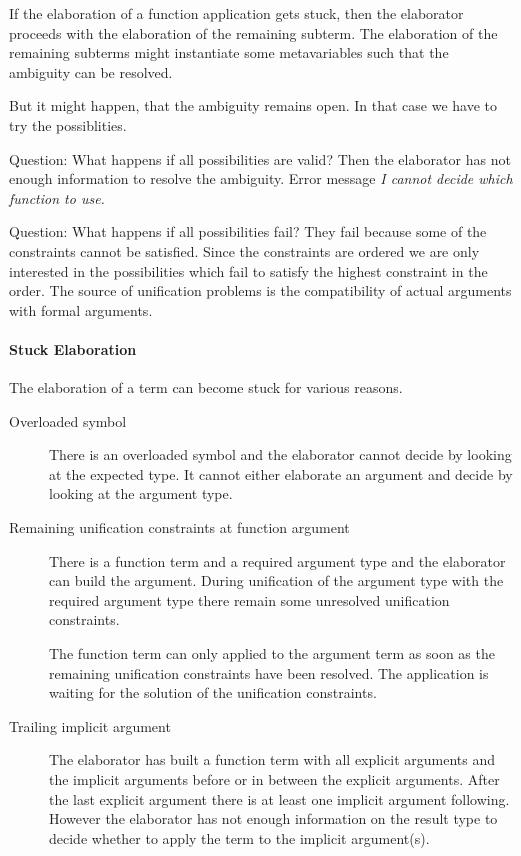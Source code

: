 If the elaboration of a function application gets stuck, then the elaborator
proceeds with the elaboration of the remaining subterm. The elaboration of the
remaining subterms might instantiate some metavariables such that the ambiguity
can be resolved.

But it might happen, that the ambiguity remains open. In that case we have to
try the possiblities.

Question: What happens if all possibilities are valid? Then the elaborator has
not enough information to resolve the ambiguity. Error message \emph{I cannot
decide which function to use.}

Question: What happens if all possibilities fail? They fail because some of the
constraints cannot be satisfied. Since the constraints are ordered we are only
interested in the possibilities which fail to satisfy the highest constraint in
the order. The source of unification problems is the compatibility of actual
arguments with formal arguments.



\paragraph{Stuck Elaboration} The elaboration of a term can become stuck for
various reasons.

\begin{description}

    \item [Overloaded symbol]

        There is an overloaded symbol and the elaborator cannot decide by
        looking at the expected type. It cannot either elaborate an argument and
        decide by looking at the argument type.

    \item [Remaining unification constraints at function argument]

        There is a function term and a required argument type and the elaborator
        can build the argument. During unification of the argument type with the
        required argument type there remain some unresolved unification
        constraints.

        The function term can only applied to the argument term as soon as the
        remaining unification constraints have been resolved. The application is
        waiting for the solution of the unification constraints.

    \item [Trailing implicit argument]

        The elaborator has built a function term with all explicit arguments and
        the implicit arguments before or in between the explicit arguments.
        After the last explicit argument there is at least one implicit argument
        following. However the elaborator has not enough information on the
        result type to decide whether to apply the term to the implicit
        argument(s).

\end{description}



